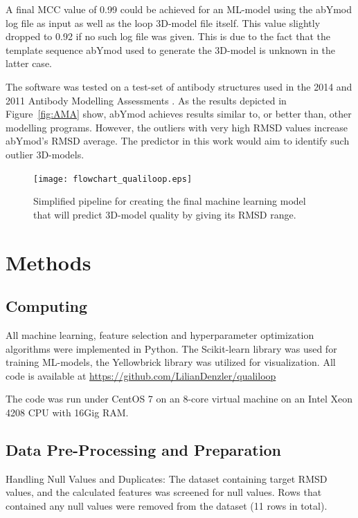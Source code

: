 \documentclass[12pt]{article}
\begin{document}
A final MCC value of 0.99 could be achieved for an ML-model
using the abYmod log file as input as well as the loop 3D-model file
itself. This value slightly dropped to 0.92 if no such log file was
given. This is due to the fact that the template sequence
abYmod used to generate the 3D-model is unknown in the latter case.



The software
was tested on a test-set of antibody structures used in the 2014 and
2011 Antibody Modelling Assessments
\cite{Almagro2011,Almagro2014}. As the results depicted in
Figure~\ref{fig:AMA} show, abYmod achieves results similar to, or better than,
other modelling programs. However, the outliers with very high RMSD
values increase abYmod's RMSD average. The predictor in this work
would aim to identify such outlier 3D-models.


\begin{figure}
  \centering
  \texttt{[image: flowchart\_qualiloop.eps]}
  \caption {Simplified pipeline for creating the final machine learning model that will predict 3D-model quality by giving its RMSD range.}
  \label{fig:flow}
\end{figure}
 
\section{Methods}

\subsection{Computing}
All machine learning, feature selection and hyperparameter
optimization algorithms were implemented in Python. The Scikit-learn
library was used for training ML-models, the
Yellowbrick\cite{Bengfort2021} library was utilized for
visualization. All code is available at
\url{https://github.com/LilianDenzler/qualiloop}

The code was run under CentOS 7 on an 8-core virtual machine on an
Intel Xeon 4208 CPU with 16Gig RAM.

\subsection{Data Pre-Processing and Preparation}
Handling Null Values and Duplicates: The dataset containing target
RMSD values, and the calculated features was screened for null
values.
Rows that contained any null values were
removed from the dataset (11 rows in total).
\end{document}
